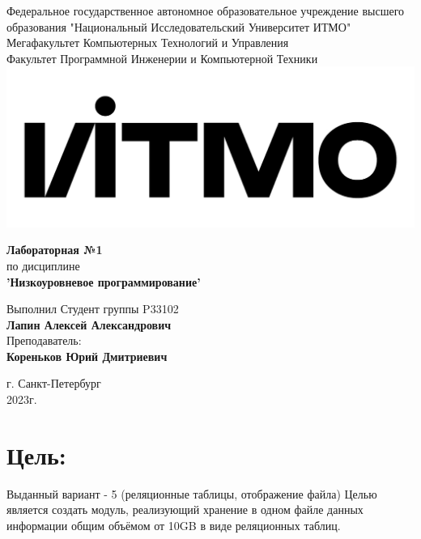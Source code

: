 \documentclass[12pt,onecolumn]{article}
\begin{document}
\setcounter{tocdepth}{4}
\begin{center}
    Федеральное государственное автономное образовательное учреждение высшего образования "Национальный Исследовательский Университет ИТМО"\\ 
    Мегафакультет Компьютерных Технологий и Управления\\
    Факультет Программной Инженерии и Компьютерной Техники \\
    \includegraphics[scale=0.3]{image/itmo.jpg} %
\end{center}
\vspace{1cm}


\begin{center}
    \textbf{Лабораторная №1}\\
    по дисциплине\\
    \textbf{'Низкоуровневое программирование'}
\end{center}

\vspace{2cm}

\begin{flushright}
  Выполнил Студент  группы P33102\\
  \textbf{Лапин Алексей Александрович}\\
  Преподаватель: \\
  \textbf{Кореньков Юрий Дмитриевич}\\
\end{flushright}

\vspace{6cm}
\begin{center}
    г. Санкт-Петербург\\
    2023г.
\end{center}

\newpage
\tableofcontents
\newpage

\section{Цель:}
Выданный вариант - 5 (реляционные таблицы, отображение файла)
Целью является создать модуль, реализующий хранение в одном файле данных информации общим объёмом от 10GB в виде реляционных таблиц.
\end{document}
